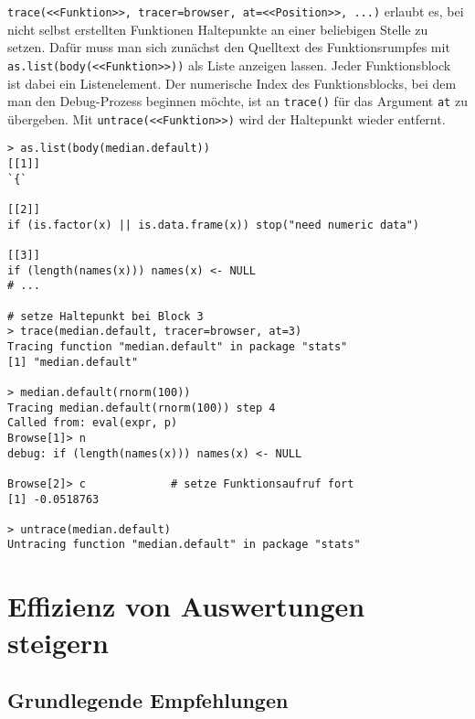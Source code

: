 \lstinline!trace(<<Funktion>>, tracer=browser, at=<<Position>>, ...)! erlaubt es, bei nicht selbst erstellten Funktionen Haltepunkte an einer beliebigen Stelle zu setzen. Dafür muss man sich zunächst den Quelltext des Funktionsrumpfes mit \lstinline!as.list(body(<<Funktion>>))! als Liste anzeigen lassen. Jeder Funktionsblock ist dabei ein Listenelement. Der numerische Index des Funktionsblocks, bei dem man den Debug-Prozess beginnen möchte, ist an \lstinline!trace()! für das Argument \lstinline!at! zu übergeben. Mit \lstinline!untrace(<<Funktion>>)! wird der Haltepunkt wieder entfernt.
\begin{lstlisting}
> as.list(body(median.default))
[[1]]
`{`

[[2]]
if (is.factor(x) || is.data.frame(x)) stop("need numeric data")

[[3]]
if (length(names(x))) names(x) <- NULL
# ...

# setze Haltepunkt bei Block 3
> trace(median.default, tracer=browser, at=3)
Tracing function "median.default" in package "stats"
[1] "median.default"

> median.default(rnorm(100))
Tracing median.default(rnorm(100)) step 4 
Called from: eval(expr, p)
Browse[1]> n
debug: if (length(names(x))) names(x) <- NULL

Browse[2]> c             # setze Funktionsaufruf fort
[1] -0.0518763

> untrace(median.default)
Untracing function "median.default" in package "stats"
\end{lstlisting}

\section{Effizienz von Auswertungen steigern}
\label{sec:performance}

\subsection{Grundlegende Empfehlungen}
\label{sec:efficiency}

